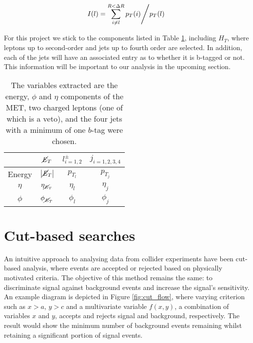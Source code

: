 \begin{equation}
    \left. I(l) = \sum\limits_{i\ne l}^{R<\Delta R} p_T(i) \middle/ p_T(l) \right. \\
    \label{eq:iso}
\end{equation}


For this project we stick to the components listed in Table \ref{tab:variables}, including $H_T$, where leptons up to second-order and jets up to fourth order are selected. In addition, each of the jets will have an associated entry as to whether it is b-tagged or not. This information will be important to our analysis in the upcoming section. \\ 


\begin{table}[htbp]
    \centering
    \begin{tabular}{c|c|c|c} 
    \toprule
     & $\cancel{\it{E}}_{T}$ & $l^{\pm}_{i=1,2}$ & $j_{i=1,2,3,4}$ \\
    \midrule
    \rowcolor{gray!6} Energy & $\abs{\cancel{\it{E}}_{T}}$ & $ p_{T_l} $ & $ p_{T_j} $ \\
    $\eta$ & $\eta_{\cancel{\it{E}}_{T}}$ & $ \eta_l $ & $ \eta_j $ \\
    \rowcolor{gray!6} $\phi$ & $\phi_{\cancel{\it{E}}_{T}}$ & $ \phi_l $ & $ \phi_j $ \\
    \bottomrule
    \end{tabular}
    \caption{The variables extracted are the energy, $\phi$ and $\eta$ components of the MET, two charged leptons (one of which is a veto), and the four jets with a minimum of one $b$-tag were chosen.} 
    \label{tab:variables}
\end{table}

\section{Cut-based searches}
\label{sec:cut}
An intuitive approach to analysing data from collider experiments have been cut-based analysis, where events are accepted or rejected based on physically motivated criteria. The objective of this method remains the same: to discriminate signal against background events and increase the signal's sensitivity. An example diagram is depicted in Figure \ref{fig:cut_flow}, where varying criterion such as $x>a$, $y>c$ and a multivariate variable $f(x,y)$, a combination of variables $x$ and $y$, accepts and rejects signal and background, respectively. The result would show the minimum number of background events remaining whilst retaining a significant portion of signal events.  \\

